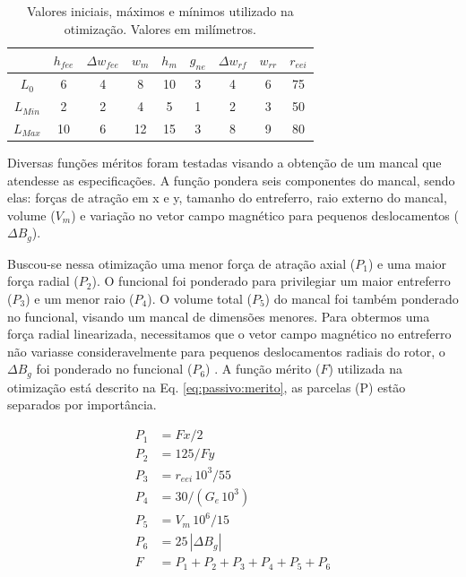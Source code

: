 \begin{table}[ht!]
	\centering
	\begin{tabular}{c c c c c c c c c}
		& $h_{fee}$ &$\Delta w_{fee}$ & $w_m$ & $h_m$  & $g_{ne}$ & $\Delta w_{rf}$ & $w_{rr}$ & $r_{eei}$ \\ \hline \hline
		
		$L_{0}$ 	&  6 &   4 &    8 &    10 &   3 &  4 &   6 &    75 \\
		$L_{Min}$ &  2    &  2   &  4  &   5&    1  & 2  &  3&    50\\			
		$L_{Max}$ &  10 &  6 &  12  &   15  &  3  &  8  &   9   &   80		
	\end{tabular} 
	\caption{Valores iniciais, máximos e mínimos utilizado na otimização. Valores em milímetros.}
	\label{tab:passivo:restrições} 
\end{table}

Diversas funções méritos foram testadas visando a obtenção de um mancal que atendesse as especificações. A função pondera seis componentes do mancal, sendo elas: forças de atração em x e y, tamanho do entreferro, raio externo do mancal,  volume ($V_m$) e variação no vetor campo magnético para pequenos deslocamentos ($\Delta B_{g}$).

Buscou-se nessa otimização uma menor força de atração axial ($P_1$) e uma maior força radial ($P_2$). O funcional foi ponderado para privilegiar um maior entreferro ($P_3$) e um menor raio ($P_4$). O volume total ($P_5$) do mancal foi também ponderado no funcional, visando um mancal de dimensões menores. Para obtermos uma força radial linearizada, necessitamos que o vetor campo magnético no entreferro não variasse consideravelmente para pequenos deslocamentos radiais do rotor, o $\Delta B_{g}$ foi ponderado no funcional ($P_6$) . A função mérito ($F$) utilizada na otimização está descrito na Eq. \ref{eq:passivo:merito}, as parcelas (P) estão separados por importância.

\begin{align}
P_1 &= Fx/2 				\\ 
P_2 &= 125/Fy		\\        
P_3 &= r_{eei}\, 10^3/55 \\     
P_4&= 30/(G_e \,  10^3) \\    
P_5 &= V_m\, 10^6/15 \\        
P_6 &= 25 \,  |{\Delta B_{g}}|\\   
F &= P_1 + P_2 + P_3 + P_4 + P_5 + P_6   \label{eq:passivo:merito}
\end{align}

